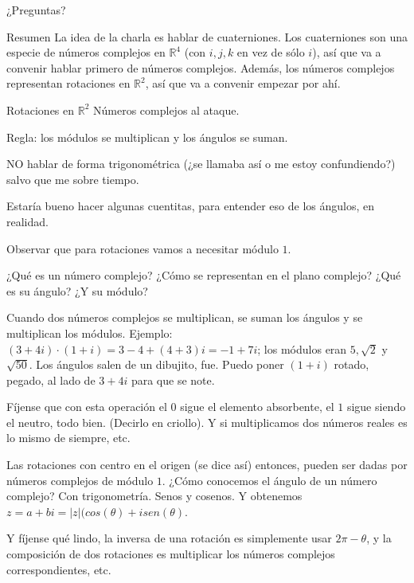 \documentclass[10pt]{beamer}
\def\R{\mathbb{R}}
\begin{document}
\begin{frame}

\end{frame}

\begin{frame}{¿Preguntas?}

\end{frame}





\begin{frame}{Resumen}
	La idea de la charla es hablar de cuaterniones. Los cuaterniones son una especie de números complejos en $\R^4$ (con $i,j,k$ en vez de sólo $i$), así que va a convenir hablar primero de números complejos. Además, los números complejos representan rotaciones en $\R^2$, así que va a convenir empezar por ahí.


\end{frame}


\begin{frame}{Rotaciones en $\mathbb{R}^2$}
 Números complejos al ataque.
 
 Regla: los módulos se multiplican y los ángulos se suman.
 
 NO hablar de forma trigonométrica (¿se llamaba así o me estoy confundiendo?) salvo que me sobre tiempo.
 
 Estaría bueno hacer algunas cuentitas, para entender eso de los ángulos, en realidad.
 
 Observar que para rotaciones vamos a necesitar módulo $1$.
\end{frame}

\begin{frame}
	¿Qué es un número complejo? ¿Cómo se representan en el plano complejo? ¿Qué es su ángulo? ¿Y su módulo?

	Cuando dos números complejos se multiplican, se suman los ángulos y se multiplican los módulos. Ejemplo: $(3+4i) \cdot (1+i) = 3-4 + (4+3)i = -1 +7i$; los módulos eran $5,\sqrt{2}$ y $\sqrt{50}$. Los ángulos salen de un dibujito, fue. Puedo poner $(1+i)$ rotado, pegado, al lado de $3+4i$ para que se note.
	
	Fíjense que con esta operación el $0$ sigue el elemento absorbente, el $1$ sigue siendo el neutro, todo bien. (Decirlo en criollo). Y si multiplicamos dos números reales es lo mismo de siempre, etc.	
	
	
	Las rotaciones con centro en el origen (se dice así) entonces, pueden ser dadas por números complejos de módulo $1$. ¿Cómo conocemos el ángulo de un número complejo? Con trigonometría. Senos y cosenos. Y obtenemos $z=a+bi = |z| (cos(\theta) + i sen(\theta)$.

Y fíjense qué lindo, la inversa de una rotación es simplemente usar $2\pi-\theta$, y la composición de dos rotaciones es multiplicar los números complejos correspondientes, etc.
\end{frame}
\end{document}
